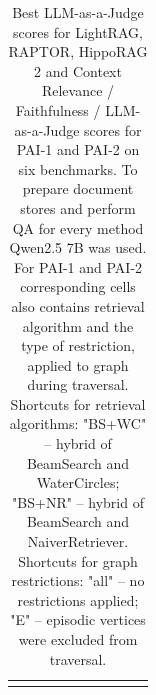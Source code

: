 \begin{table}[th!]
{\begin{tabular}{|cc|c|c|c|c|c|c|c||c|}
    \hhline{|-|-|-|-|-|-|-|-|-||-|}
    \end{tabular}}
    \renewcommand{\arraystretch}{1}
    \caption{Best LLM-as-a-Judge scores for LightRAG, RAPTOR, HippoRAG 2 and Context Relevance / Faithfulness / LLM-as-a-Judge scores for PAI-1 and PAI-2 on six benchmarks. To prepare document stores and perform QA for every method Qwen2.5 7B was used. For PAI-1 and PAI-2 corresponding cells also contains retrieval algorithm and the type of restriction, applied to graph during traversal. Shortcuts for retrieval algorithms: "BS+WC" – hybrid of BeamSearch and WaterCircles; "BS+NR" – hybrid of BeamSearch and NaiverRetriever. Shortcuts for graph restrictions: "all" – no restrictions applied; "E" – episodic vertices were excluded from traversal.}
	\label{tab:main_comparison}
\end{table}


